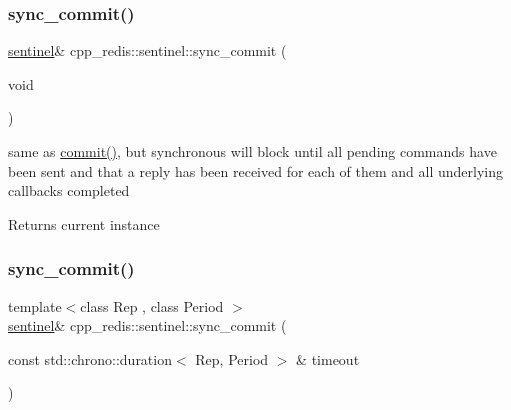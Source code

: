 \mbox{\label{classcpp__redis_1_1sentinel_a8e4d231ac89510c337fe97fe9e642785}} 
\subsubsection{\texorpdfstring{sync\+\_\+commit()}{sync\_commit()}\hspace{0.1cm}{\footnotesize\ttfamily [1/2]}}
{\footnotesize\ttfamily \hyperlink{classcpp__redis_1_1sentinel}{sentinel}\& cpp\+\_\+redis\+::sentinel\+::sync\+\_\+commit (\begin{DoxyParamCaption}\item[{void}]{ }\end{DoxyParamCaption})}

same as \hyperlink{classcpp__redis_1_1sentinel_ad4f85d486499f82225b244f85091b31e}{commit()}, but synchronous will block until all pending commands have been sent and that a reply has been received for each of them and all underlying callbacks completed

\begin{DoxyReturn}{Returns}
current instance 
\end{DoxyReturn}
\mbox{\label{classcpp__redis_1_1sentinel_afbaa0b80266f70ad98c0bf8f28c533ab}} 
\subsubsection{\texorpdfstring{sync\+\_\+commit()}{sync\_commit()}\hspace{0.1cm}{\footnotesize\ttfamily [2/2]}}
{\footnotesize\ttfamily template$<$class Rep , class Period $>$ \\
\hyperlink{classcpp__redis_1_1sentinel}{sentinel}\& cpp\+\_\+redis\+::sentinel\+::sync\+\_\+commit (\begin{DoxyParamCaption}\item[{const std\+::chrono\+::duration$<$ Rep, Period $>$ \&}]{timeout }\end{DoxyParamCaption})\hspace{0.3cm}{\ttfamily [inline]}}

